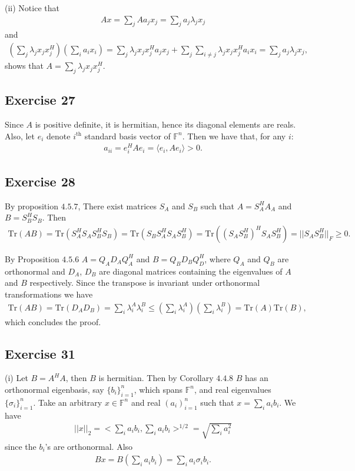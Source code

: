 \documentclass[11.5pt, letterpaper, bibtotoc,
    tablecaptionabove, figurecaptionabove]{article}
\begin{document}
(ii)
Notice that
\begin{align*}
    Ax = \sum_jAa_jx_j = \sum_ja_j\lambda_jx_j
\end{align*}
and
\begin{align*}
    \left(\sum_j\lambda_jx_jx_j^H\right)\left(\sum_ia_ix_i\right)=
    \sum_j\lambda_jx_jx_j^Ha_jx_j + \sum_j\sum_{i\neq j}\lambda_jx_jx_j^Ha_ix_i =
    \sum_ja_j\lambda_jx_j,
\end{align*}
shows that $A=\sum_j\lambda_jx_jx_j^H$.

\subsection*{Exercise 27}
Since $A$ is positive definite, it is hermitian, hence its diagonal elements are reals.
Also, let $e_i$ denote $i^\text{th}$ standard basis vector of $\mathbb F^n$.
Then we have that, for any $i$:
\begin{align*}
    a_{ii} = e_i^HAe_i = \langle e_i,Ae_i\rangle > 0.
\end{align*}

\subsection*{Exercise 28}

By proposition $4.5.7$, There exist matrices $S_A$ and $S_B$ 
such that $A=S_A^HA_A$ and $B = S_B^HS_B$.
Then 
\begin{align*}
    \text{Tr}(AB) = \text{Tr}(S_A^HS_AS_B^HS_B) =
    \text{Tr}(S_BS_A^HS_AS_B^H) = \text{Tr}((S_AS_B^H)^HS_AS_B^H)
    = ||S_AS_B^H||_F\geq 0.
\end{align*}

By Proposition $4.5.6$ $A=Q_AD_AQ_A^H$ and $B=Q_BD_BQ_D^H$, where $Q_A$ and $Q_B$
are orthonormal and $D_A$, $D_B$ are diagonal matrices containing the eigenvalues
of $A$ and $B$ respectively.
Since the transpose is invariant under orthonormal transformations we have
\begin{align*}
    \text{Tr}(AB)=\text{Tr}(D_AD_B)=\sum_i\lambda_i^A\lambda_i^B\leq
    \left(\sum_i\lambda_i^A\right)\left(\sum_i\lambda_i^B\right)=\text{Tr}(A)\text{Tr}(B),
\end{align*}
which concludes the proof.

\subsection*{Exercise 31}
(i)
Let $B=A^HA$, then $B$ is hermitian.
Then by Corollary $4.4.8$ $B$ has an orthonormal eigenbasis, say $\{b_i\}_{i=1}^n$,
which spans $\mathbb F^n$,
and real eigenvalues $\{\sigma_i\}_{i=1}^n$.
Take an arbitrary $x\in\mathbb F^n$ and real $(a_i)_{i=1}^n$ such that
$x=\sum_ia_ib_i$.
We have 
\begin{align*}
    ||x||_2=<\sum_ia_ib_i,\sum_ia_ib_i>^{1/2}=
    \sqrt{\sum_ia_i^2}
\end{align*}
since the $b_i$'s are orthonormal.
Also
\begin{align*}
    Bx=B\left(\sum_ia_ib_i\right)=\sum_ia_i\sigma_ib_i.
\end{align*}
\end{document}
